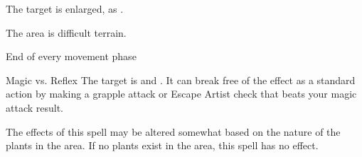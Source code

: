 \begin{spellheader}
    \spelldur{\durshort \dismissable}
\end{spellheader}
\begin{spelleffects}
    \spelleffect The target is enlarged, as .
\end{spelleffects}
\begin{spellfooter}

\end{spellfooter}

\begin{spellheader}
    \spelldur{\durshort \dismissable}
\end{spellheader}
\begin{spelleffects}
    \spelleffect The area is difficult terrain.
    \begin{spelltrigger}{End of every movement phase}
        \begin{spellattack}{Magic vs. Reflex}
            \spellsuccess The target is \entangled and \immobilized. It can break free of the effect as a standard action by making a grapple attack or Escape Artist check that beats your magic attack result.
        \end{spellattack}
    \end{spelltrigger}
\end{spelleffects}
\begin{spellfooter}
    \spellnotes The effects of this spell may be altered somewhat based on the nature of the plants in the area. If no plants exist in the area, this spell has no effect.
\end{spellfooter}

